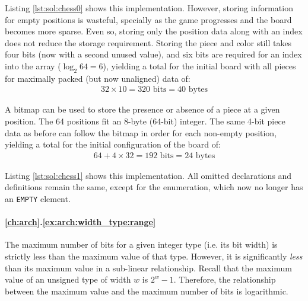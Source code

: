 Listing \ref{lst:sol:chess0} shows this implementation.  However, storing
information for empty positions is wasteful, specially as the game progresses
and the board becomes more sparse.  Even so, storing only the position data
along with an index does not reduce the storage requirement.  Storing the piece
and color still takes four bits (now with a second unused value), and six bits
are required for an index into the array ($\log_2 64 = 6$), yielding a total for
the initial board with all pieces for maximally packed (but now unaligned) data
of:
\begin{align*}
    32 \times 10 = 320\text{ bits} = 40\text{ bytes}
\end{align*}

A bitmap can be used to store the presence or absence of a piece at a given
position.  The 64 positions fit an 8-byte (64-bit) integer.  The same 4-bit
piece data as before can follow the bitmap in order for each non-empty position,
yielding a total for the initial configuration of the board of:
\begin{align*}
    64 + 4 \times 32 = 192\text{ bits} = 24\text{ bytes}
\end{align*}

Listing \ref{lst:sol:chess1} shows this implementation.  All omitted
declarations and definitions remain the same, except for the enumeration, which
now no longer has an \texttt{EMPTY} element.

\begin{figure}[p]
    
    
\end{figure}

\paragraph{\ref{ch:arch}.\ref{ex:arch:width_type:range}}

The maximum number of bits for a given integer type (i.e. its bit width) is
strictly less than the maximum value of that type\footnotemark.  However, it is
significantly \emph{less} than its maximum value in a sub-linear relationship.
Recall that the maximum value of an unsigned type of width $w$ is $2^w - 1$.
Therefore, the relationship between the maximum value and the maximum number of
bits is logarithmic.


